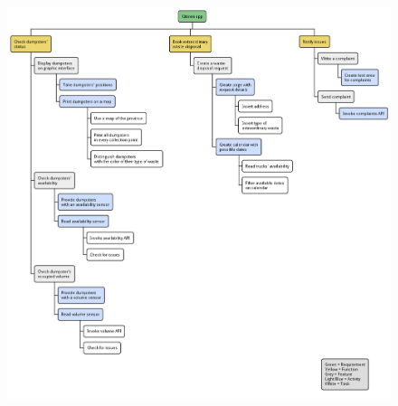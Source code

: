 \begin{figure}[H]
    \centering
    \includegraphics[width=\textwidth]{uml/wbs-citizen-app.pm}
    \caption{}
    \label{fig:uml/wbs-citizen-app}
\end{figure}

